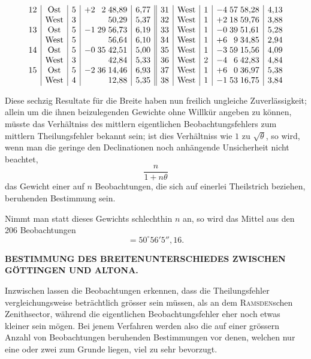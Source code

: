 {\[\begin{array}{@{}r|c|c|r@{\;}r@{\;}r|r||r|c|c|r@{\;}r@{\;}r|r@{}}
12&\text{Ost}&5&+2&2&48{,}89&6{,}77&31&\text{West}&1&-4&57&58{,}28&4{,}13\\
&\text{West}&3&&&50{,}29&5{,}37&32&\text{West}&1&+2&18&59{,}76&3{,}88\\
13&\text{Ost}&5&-1&29&56{,}73&6{,}19&33&\text{West}&1&-0&39&51{,}61&5{,}28\\
&\text{West}&5&&&56{,}64&6{,}10&34&\text{West}&1&+6&9&34{,}85&2{,}94\\
14&\text{Ost}&5&-0&35&42{,}51&5{,}00&35&\text{West}&1&-3&59&15{,}56&4{,}09\\
&\text{West}&3&&&42{,}84&5{,}33&36&\text{West}&2&-4&6&42{,}83&4{,}84\\
15&\text{Ost}&5&-2&36&14{,}46&6{,}93&37&\text{West}&1&+6&0&36{,}97&5{,}38\\
&\text{West}&4&&&12{,}88&5{,}35&38&\text{West}&1&-1&53&16{,}75&3{,}84
\end{array}
\]
\par
}

Diese sechzig Resultate für die Breite haben nun freilich ungleiche
Zuverlässigkeit; allein um die ihnen beizulegenden Gewichte ohne Willkür
angeben zu können, müsste das Verhältniss des mittlern eigentlichen
Beobachtungsfehlers zum mittlern Theilungsfehler bekannt sein; ist dies Verhältniss
wie \(1\) zu \(\surd\theta\), so wird, wenn man die geringe den Declinationen noch
anhängende Unsicherheit nicht beachtet,
\[
\frac n{1+n\theta}
\]
\noindent das Gewicht einer auf \(n\) Beobachtungen, die sich auf einerlei Theilstrich
beziehen, beruhenden Bestimmung sein.

Nimmt man statt dieses Gewichts schlechthin \(n\) an, so wird das Mittel
aus den 206 Beobachtungen
\[
=50^\circ56'5''{,}16.
\]

\par\clearpage
\noindent{}\parbox[t]{\dimexpr\linewidth-24mm\relax}{\centering\scriptsize\bfseries BESTIMMUNG DES BREITENUNTERSCHIEDES ZWISCHEN GÖTTINGEN UND ALTONA.}\makebox[12mm][r]{}\par\medskip

Inzwischen lassen die Beobachtungen erkennen, dass die Theilungsfehler
vergleichungsweise beträchtlich grösser sein müssen, als an dem \textsc{Ramsden}schen
Zenithsector, während die eigentlichen Beobachtungsfehler eher noch etwas
kleiner sein mögen. Bei jenem Verfahren werden also die auf einer grössern
Anzahl von Beobachtungen beruhenden Bestimmungen vor denen, welchen nur
eine oder zwei zum Grunde liegen, viel zu sehr bevorzugt.

